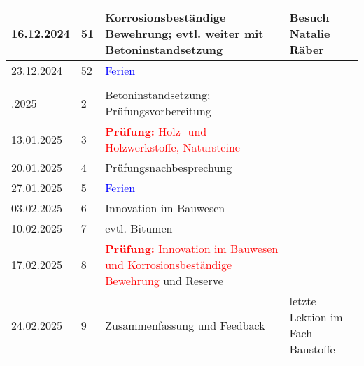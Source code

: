 \documentclass[
11pt,
captions=tableheading,
headings=big,
headsepline,
footsepline, 
captions=tableheading,
parskip=half-,
]{scrartcl}
\newcommand{\red}[1]{\textcolor{red}{#1}}
\begin{document}
\begin{table}[H]
\begin{tabular}{llp{8.5cm}p{3.5cm}}
        16.12.2024     & 51          & Korrosionsbeständige Bewehrung; evtl. weiter mit Betoninstandsetzung           & Besuch Natalie Räber             \\
        \midrule
        23.12.2024     & 52          & \textcolor{blue}{Ferien}                                                       & {}                               \\
        \midrule
        \\ \addlinespace
        \midrule
        06.01.2025     & 2           & Betoninstandsetzung; Prüfungsvorbereitung                                      & {}                               \\
        13.01.2025     & 3           & \red{\textbf{Prüfung:} Holz- und Holzwerkstoffe, Natursteine}                  & {}                               \\
        20.01.2025     & 4           & Prüfungsnachbesprechung                                                        & {}                               \\
        \midrule
        27.01.2025     & 5           & \textcolor{blue}{Ferien}                                                       & {}                               \\
        \midrule
        03.02.2025     & 6           & Innovation im Bauwesen                                                         & {}                               \\
        10.02.2025     & 7           & evtl. Bitumen                                                                  & {}                               \\
        17.02.2025     & 8           & \red{\textbf{Prüfung:} Innovation im Bauwesen und Korrosionsbeständige Bewehrung} und Reserve                     & {}                               \\
        24.02.2025     & 9           & Zusammenfassung und Feedback                                                   & letzte Lektion im Fach Baustoffe \\
        \bottomrule
    \end{tabular}
\end{table}
\end{document}
